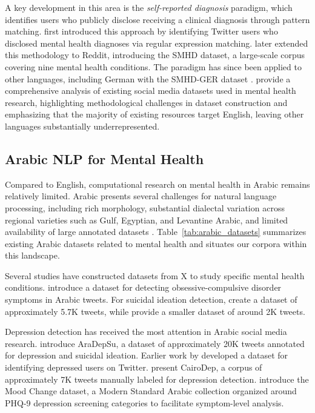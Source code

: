 \documentclass[11pt]{article}
\begin{document}
A key development in this area is the \textit{self-reported diagnosis} paradigm,
which identifies users who publicly disclose receiving a clinical diagnosis through
pattern matching. \citet{coppersmith2014quantifying} first introduced this approach
by identifying Twitter users who disclosed mental health diagnoses via regular
expression matching. \citet{cohan-etal-2018-smhd} later extended this methodology to
Reddit, introducing the SMHD dataset, a large-scale corpus covering nine mental
health conditions. The paradigm has since been applied to other languages,
including German with the SMHD-GER dataset \cite{zanwar2023smhd}.
\citet{harrigian2021state} provide a comprehensive analysis of existing social
media datasets used in mental health research, highlighting methodological
challenges in dataset construction and emphasizing that the majority of existing
resources target English, leaving other languages substantially underrepresented.

\subsection{Arabic NLP for Mental Health}
\label{subsec:related_arabic}

Compared to English, computational research on mental health in Arabic remains
relatively limited. Arabic presents several challenges for natural language
processing, including rich morphology, substantial dialectal variation across
regional varieties such as Gulf, Egyptian, and Levantine Arabic, and limited
availability of large annotated datasets \cite{darwish2021panoramic, alayba2025arabic}.
Table~\ref{tab:arabic_datasets} summarizes existing Arabic datasets related to
mental health and situates our corpora within this landscape.

Several studies have constructed datasets from X to study specific mental health
conditions. \citet{al2024classification} introduce a dataset for detecting
obsessive-compulsive disorder symptoms in Arabic tweets. For suicidal ideation
detection, \citet{abdulsalam2024detecting} create a dataset of approximately 5.7K
tweets, while \citet{baghdadi2022optimized} provide a smaller dataset of around
2K tweets.

Depression detection has received the most attention in Arabic social media
research. \citet{hassib2022aradepsu} introduce AraDepSu, a dataset of
approximately 20K tweets annotated for depression and suicidal ideation.
Earlier work by \citet{almouzini2019detecting} developed a dataset for identifying
depressed users on Twitter. \citet{elramly2021cairodep} present CairoDep, a corpus
of approximately 7K tweets manually labeled for depression detection.
\citet{maghraby2022mood} introduce the Mood Change dataset, a Modern Standard
Arabic collection organized around PHQ-9 depression screening categories to
facilitate symptom-level analysis.
\end{document}
